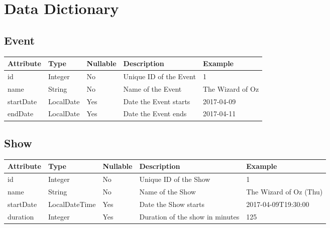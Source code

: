 
\chapter{Data Dictionary}

\section{Event}

\keepXColumns
\begin{tabularx}{\textwidth}{l l l X l}
  \textbf{Attribute}  & \textbf{Type} & \textbf{Nullable} & \textbf{Description}    & \textbf{Example} \\
  \endhead
  id                  & Integer       & No                & Unique ID of the Event  & 1\\
  name                & String        & No                & Name of the Event       & The Wizard of Oz\\
  startDate           & LocalDate     & Yes               & Date the Event starts   & 2017-04-09\\
  endDate             & LocalDate     & Yes               & Date the Event ends     & 2017-04-11\\
\end{tabularx}

\section{Show}

\keepXColumns
\begin{tabularx}{\textwidth}{l l l X l}
  \textbf{Attribute}  & \textbf{Type} & \textbf{Nullable} & \textbf{Description}            & \textbf{Example} \\
  \endhead
  id                  & Integer       & No                & Unique ID of the Show           & 1\\
  name                & String        & No                & Name of the Show                & The Wizard of Oz (Thu)\\
  startDate           & LocalDateTime & Yes               & Date the Show starts            & 2017-04-09T19:30:00\\
  duration            & Integer       & Yes               & Duration of the show in minutes & 125\\
\end{tabularx}

